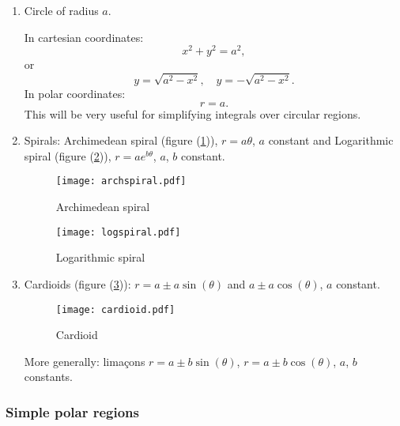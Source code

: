   \begin{examples}
    \begin{enumerate}
      \item Circle of radius $a$.
        
        In cartesian coordinates:
          \[
            x^2 + y^2 = a^2,
          \]
        or
          \[
            y = \sqrt{a^2 - x^2}, \quad y = - \sqrt{a^2 - x^2}.
          \]
        In polar coordinates:
          \[
            r = a.
          \]
        This will be very useful for simplifying integrals over circular regions.
      \item Spirals: Archimedean spiral (figure (\ref{arch})), $r = a\theta$, $a$ constant and Logarithmic spiral (figure (\ref{log})), $r = ae^{b\theta}$, $a$, $b$ constant.

        \begin{figure}[!htbp]
          \centering
          \texttt{[image: archspiral.pdf]}
          \caption{Archimedean spiral}
          \label{arch}
        \end{figure}

        \begin{figure}[!hbtp]
          \centering
          \texttt{[image: logspiral.pdf]}
          \caption{Logarithmic spiral}
          \label{log}
        \end{figure}
        
      \item Cardioids (figure (\ref{card})): $r = a \pm a\sin(\theta)$ and $a \pm a\cos(\theta)$, $a$ constant.

        \begin{figure}[!htpb]
          \centering
          \texttt{[image: cardioid.pdf]}
          \caption{Cardioid}
          \label{card}
        \end{figure}

        More generally: lima\c{c}ons $r = a \pm b\sin(\theta)$, $r = a \pm b\cos(\theta)$, $a$, $b$ constants.
    \end{enumerate}
  \end{examples}
  
  \subsubsection*{Simple polar regions}
  
